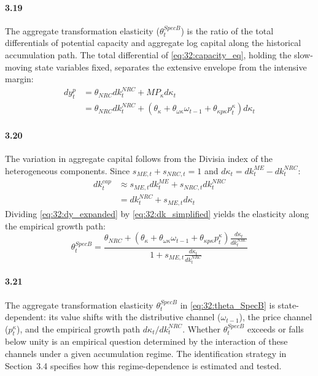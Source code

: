\paragraph{3.19}
The aggregate transformation elasticity
($\theta^{SpecB}_t$) is the ratio of the total differentials
of potential capacity and aggregate log capital along the
historical accumulation path. The total differential of
\eqref{eq:32:capacity_eq}, holding the slow-moving state
variables fixed, separates the extensive envelope from the
intensive margin:
\begin{align}
	dy^p_t &= \theta_{NRC} dk^{NRC}_t + MP_\kappa d\kappa_t
	\label{eq:32:dy_total} \\
	&= \theta_{NRC} dk^{NRC}_t
	+ \left(\theta_\kappa + \theta_{\omega\kappa} \omega_{t-1}
	+ \theta_{\kappa p\kappa} p^\kappa_t\right) d\kappa_t
	\label{eq:32:dy_expanded}
\end{align}

\paragraph{3.20}
The variation in aggregate capital follows from the Divisia
index of the heterogeneous components. Since
$s_{ME,t} + s_{NRC,t} = 1$ and
$d\kappa_t = dk^{ME}_t - dk^{NRC}_t$:
\begin{align}
	dk^{cap}_t &\approx s_{ME,t} dk^{ME}_t
	+ s_{NRC,t} dk^{NRC}_t
	\label{eq:32:dk_divisia} \\
	&= dk^{NRC}_t + s_{ME,t} d\kappa_t
	\label{eq:32:dk_simplified}
\end{align}
Dividing \eqref{eq:32:dy_expanded} by
\eqref{eq:32:dk_simplified} yields the elasticity along the
empirical growth path:
\begin{equation}
	\theta^{SpecB}_t
	= \frac{\theta_{NRC}
		+ \left(\theta_\kappa + \theta_{\omega\kappa} \omega_{t-1}
		+ \theta_{\kappa p\kappa} p^\kappa_t\right)
		\frac{d\kappa_t}{dk^{NRC}_t}}
	{1 + s_{ME,t} \frac{d\kappa_t}{dk^{NRC}_t}}
	\label{eq:32:theta_SpecB}
\end{equation}

\paragraph{3.21}
The aggregate transformation elasticity
$\theta^{SpecB}_t$ in \eqref{eq:32:theta_SpecB} is
state-dependent: its value shifts with the distributive
channel ($\omega_{t-1}$), the price channel
($p^\kappa_t$), and the empirical growth path
$d\kappa_t / dk^{NRC}_t$. Whether $\theta^{SpecB}_t$
exceeds or falls below unity is an empirical question
determined by the interaction of these channels under a
given accumulation regime. The identification strategy in
Section~3.4 specifies how this regime-dependence is
estimated and tested.



